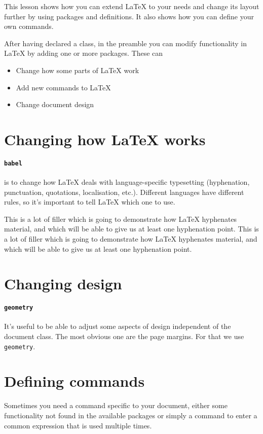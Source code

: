 \documentclass{article}
\begin{document}
This lesson shows how you can extend LaTeX to your needs and change its layout further by using packages and definitions. It also shows how you can define your own commands.

\vspace{0.5cm}

After having declared a class, in the preamble you can modify functionality in LaTeX by adding one or more packages. These can

\begin{itemize}
    \item Change how some parts of LaTeX work
    \item Add new commands to LaTeX
    \item Change document design
\end{itemize}

\section{Changing how LaTeX works}
\paragraph{\texttt{babel}} is to change how LaTeX deals with language-specific typesetting (hyphenation, punctuation, quotations, localisation, etc.). Different languages have different rules, so it’s important to tell LaTeX which one to use. 

This is a lot of filler which is going to demonstrate how LaTeX hyphenates
material, and which will be able to give us at least one hyphenation point.
This is a lot of filler which is going to demonstrate how LaTeX hyphenates
material, and which will be able to give us at least one hyphenation point.

\section{Changing design}
\paragraph{\texttt{geometry}} It’s useful to be able to adjust some aspects of design independent of the document class. The most obvious one are the page margins. For that we use \texttt{geometry}.

\section{Defining commands}
Sometimes you need a command specific to your document, either some functionality not found in the available packages or simply a command to enter a common expression that is used multiple times.
\end{document}
